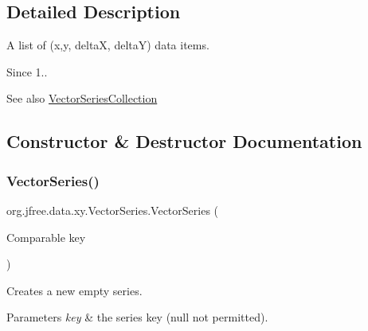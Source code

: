 \subsection{Detailed Description}
A list of (x,y, deltaX, deltaY) data items.

\begin{DoxySince}{Since}
1..
\end{DoxySince}
\begin{DoxySeeAlso}{See also}
\mbox{\hyperlink{classorg_1_1jfree_1_1data_1_1xy_1_1_vector_series_collection}{Vector\+Series\+Collection}} 
\end{DoxySeeAlso}


\subsection{Constructor \& Destructor Documentation}
\mbox{\label{classorg_1_1jfree_1_1data_1_1xy_1_1_vector_series_a08fc85c340c33a6c8e6c4daa232bc494}} 
\subsubsection{\texorpdfstring{Vector\+Series()}{VectorSeries()}\hspace{0.1cm}{\footnotesize\ttfamily [1/2]}}
{\footnotesize\ttfamily org.\+jfree.\+data.\+xy.\+Vector\+Series.\+Vector\+Series (\begin{DoxyParamCaption}\item[{Comparable}]{key }\end{DoxyParamCaption})}

Creates a new empty series.


\begin{DoxyParams}{Parameters}
{\em key} & the series key ({\ttfamily null} not permitted). \\
\hline
\end{DoxyParams}
\mbox{\label{classorg_1_1jfree_1_1data_1_1xy_1_1_vector_series_ad589521330fb16d21384fd5f61d90756}} 
